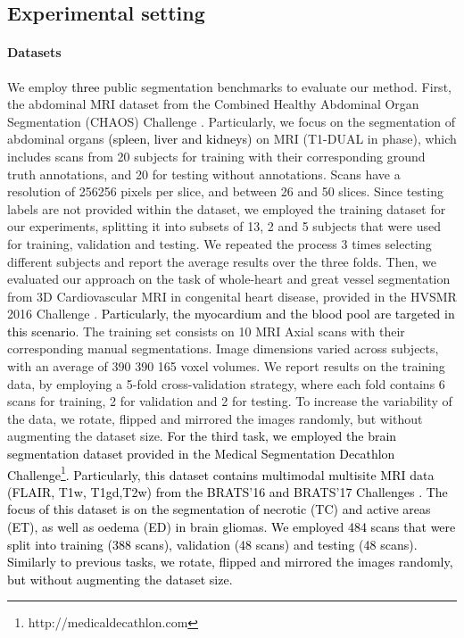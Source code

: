 \documentclass[journal]{IEEEtran}
\begin{document}
\subsection{\textbf{Experimental setting}}



\paragraph*{\textbf{Datasets}}We employ \textcolor{black}{three} public segmentation benchmarks to evaluate our method. First, the abdominal MRI dataset from the Combined Healthy Abdominal Organ Segmentation (CHAOS) Challenge \cite{selver2014exploring,selvi2015segmentation,selver2014segmentation}. Particularly, we focus on the segmentation of abdominal organs \textcolor{black}{(spleen, liver and kidneys)} on MRI (T1-DUAL in phase), which includes scans from 20 subjects for training with their corresponding ground truth annotations, and 20 for testing without annotations. Scans have a resolution of 256256 pixels per slice, and between 26 and 50 slices. Since testing labels are not provided within the dataset, we employed the training dataset for our experiments, splitting it into subsets of 13, 2 and 5 subjects that were used for training, validation and testing. We repeated the process 3 times selecting different subjects and report the average results over the three folds. Then, we evaluated our approach on the task of whole-heart and great vessel segmentation from 3D Cardiovascular MRI in congenital heart disease, provided in the HVSMR 2016 Challenge \cite{pace2015interactive}. \textcolor{black}{Particularly, the myocardium and the blood pool are targeted in this scenario}. The training set consists on 10 MRI Axial scans with their corresponding manual segmentations. Image dimensions varied across subjects, with an average of 390  390  165 voxel volumes. We report results on the training data, by employing a 5-fold cross-validation strategy, where each fold contains 6 scans for training, 2 for validation and 2 for testing. To increase the variability of the data, we rotate, flipped and mirrored the images randomly, but without augmenting the dataset size. \textcolor{black}{For the third task, we employed the brain segmentation dataset provided in the Medical Segmentation Decathlon Challenge\footnote{http://medicaldecathlon.com}. Particularly, this dataset contains multimodal multisite MRI data (FLAIR, T1w, T1gd,T2w) from the BRATS'16 and BRATS'17 Challenges \cite{menze2014multimodal,bakas2017advancing,bakas2018identifying}. The focus of this dataset is on the segmentation of necrotic (TC) and active areas (ET), as well as oedema (ED) in brain gliomas. We employed 484 scans that were split into training (388 scans), validation (48 scans) and testing (48 scans). Similarly to previous tasks, we rotate, flipped and mirrored the images randomly, but without augmenting the dataset size.}
\end{document}
